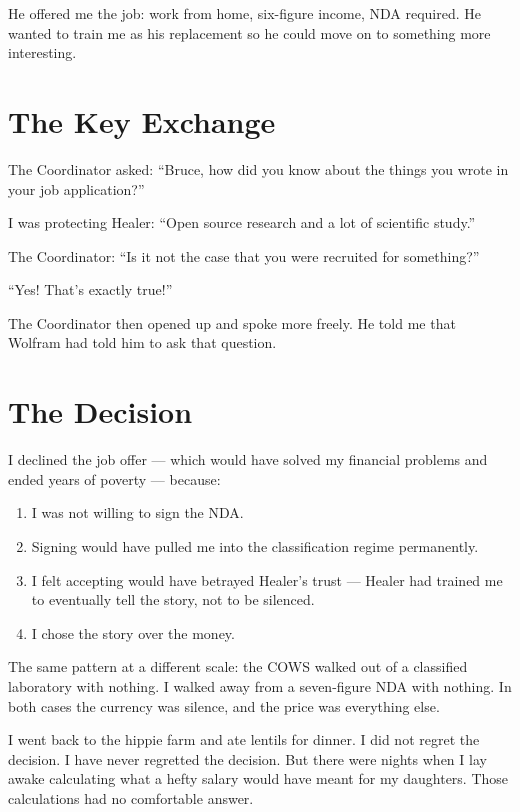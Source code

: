 He offered me the job: work from home, six-figure income, NDA required. He wanted to train me as his replacement so he could move on to something more interesting.

\section*{The Key Exchange}
\label{pos31:the-key-exchange}

The Coordinator asked: ``Bruce, how did you know about the things you wrote in your job application?''

I was protecting Healer: ``Open source research and a lot of scientific study.''

The Coordinator: ``Is it not the case that you were recruited for something?''

``Yes! That's exactly true!''

The Coordinator then opened up and spoke more freely. He told me that Wolfram had told him to ask that question.

\section*{The Decision}
\label{pos31:the-decision}

I declined the job offer --- which would have solved my financial problems and ended years of poverty --- because:

\begin{enumerate}
\item I was not willing to sign the NDA\@.
\item Signing would have pulled me into the classification regime permanently.
\item I felt accepting would have betrayed Healer's trust --- Healer had trained me to eventually tell the story, not to be silenced.
\item I chose the story over the money.
\end{enumerate}

The same pattern at a different scale: the COWS walked out of a classified laboratory with nothing. I walked away from a seven-figure NDA with nothing. In both cases the currency was silence, and the price was everything else.

I went back to the hippie farm and ate lentils for dinner. I did not regret the decision. I have never regretted the decision. But there were nights when I lay awake calculating what a hefty salary would have meant for my daughters. Those calculations had no comfortable answer.

